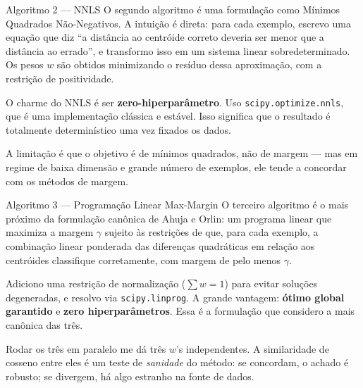 \documentclass[aspectratio=169,10pt]{beamer}
\begin{document}
\begin{frame}{Algoritmo 2 --- NNLS}
  \small
  O segundo algoritmo \'e uma formula\c{c}\~ao como M\'inimos Quadrados N\~ao-Negativos. A intui\c{c}\~ao
  \'e direta: para cada exemplo, escrevo uma equa\c{c}\~ao que diz ``a dist\^ancia ao centr\'oide correto
  deveria ser menor que a dist\^ancia ao errado'', e transformo isso em um sistema linear sobredeterminado.
  Os pesos $w$ s\~ao obtidos minimizando o res\'iduo dessa aproxima\c{c}\~ao, com a restri\c{c}\~ao de
  positividade.
  \medskip

  O charme do NNLS \'e ser \textbf{zero-hiperpar\^ametro}. Uso \texttt{scipy.optimize.nnls}, que \'e
  uma implementa\c{c}\~ao cl\'assica e est\'avel. Isso significa que o resultado \'e totalmente
  determin\'istico uma vez fixados os dados.
  \medskip

  A limita\c{c}\~ao \'e que o objetivo \'e de m\'inimos quadrados, n\~ao de margem --- mas em regime de
  baixa dimens\~ao e grande n\'umero de exemplos, ele tende a concordar com os m\'etodos de margem.
\end{frame}

\begin{frame}{Algoritmo 3 --- Programa\c{c}\~ao Linear Max-Margin}
  \small
  O terceiro algoritmo \'e o mais pr\'oximo da formula\c{c}\~ao can\^onica de Ahuja e Orlin: um programa
  linear que maximiza a margem $\gamma$ sujeito \`as restri\c{c}\~oes de que, para cada exemplo, a
  combina\c{c}\~ao linear ponderada das diferen\c{c}as quadr\'aticas em rela\c{c}\~ao aos centr\'oides
  classifique corretamente, com margem de pelo menos $\gamma$.
  \medskip

  Adiciono uma restri\c{c}\~ao de normaliza\c{c}\~ao ($\sum w = 1$) para evitar solu\c{c}\~oes degeneradas,
  e resolvo via \texttt{scipy.linprog}. A grande vantagem: \textbf{\'otimo global garantido} e
  \textbf{zero hiperpar\^ametros}. Essa \'e a formula\c{c}\~ao que considero a mais can\^onica das tr\^es.
  \medskip

  Rodar os tr\^es em paralelo me d\'a tr\^es $w$'s independentes. A similaridade de cosseno entre eles
  \'e um teste de \emph{sanidade} do m\'etodo: se concordam, o achado \'e robusto; se divergem, h\'a algo
  estranho na fonte de dados.
\end{frame}
\end{document}
